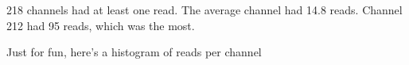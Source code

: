 218 channels had at least one read. 
The average channel had 14.8 reads. 
Channel 212 had 95 reads, which was the most.

Just for fun, here's a histogram of reads per channel\\
